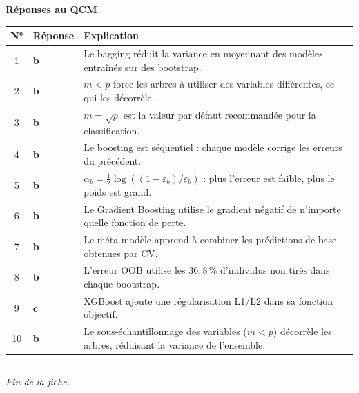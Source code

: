 \documentclass[a4paper,11pt]{article}
\begin{document}
\newpage
\begin{center}
{\Large\textbf{Réponses au QCM}}
\end{center}

\medskip

\begin{tabular}{cp{2cm}p{9cm}}
\toprule
\textbf{N°} & \textbf{Réponse} & \textbf{Explication} \\
\midrule
1 & \textbf{b} & Le bagging réduit la variance en moyennant des modèles entraînés sur des bootstrap. \\
2 & \textbf{b} & $m < p$ force les arbres à utiliser des variables différentes, ce qui les décorrèle. \\
3 & \textbf{b} & $m = \sqrt{p}$ est la valeur par défaut recommandée pour la classification. \\
4 & \textbf{b} & Le boosting est séquentiel : chaque modèle corrige les erreurs du précédent. \\
5 & \textbf{b} & $\alpha_b = \frac12 \log((1-\varepsilon_b)/\varepsilon_b)$ : plus l'erreur est faible, plus le poids est grand. \\
6 & \textbf{b} & Le Gradient Boosting utilise le gradient négatif de n'importe quelle fonction de perte. \\
7 & \textbf{b} & Le méta-modèle apprend à combiner les prédictions de base obtenues par CV. \\
8 & \textbf{b} & L'erreur OOB utilise les $36{,}8\,\%$ d'individus non tirés dans chaque bootstrap. \\
9 & \textbf{c} & XGBoost ajoute une régularisation L1/L2 dans sa fonction objectif. \\
10 & \textbf{b} & Le sous-échantillonnage des variables ($m < p$) décorrèle les arbres, réduisant la variance de l'ensemble. \\
\bottomrule
\end{tabular}

\vspace{0.5cm}

\begin{center}
\rule{0.6\textwidth}{0.4pt}
\vspace{0.3cm}
\textit{Fin de la fiche.}
\end{center}
\end{document}
